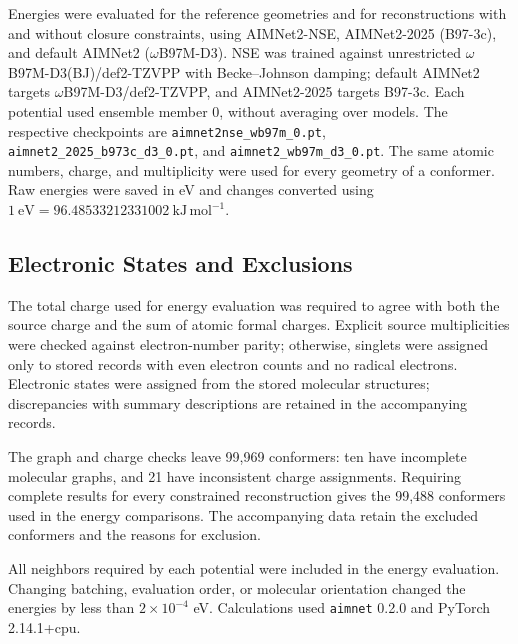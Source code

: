 \documentclass[%
 preprint,
superscriptaddress,
 amsmath,amssymb,
 aip,
 jcp,
]{revtex4-2}
\begin{document}
Energies were evaluated for the reference geometries and for reconstructions with and without closure constraints, using AIMNet2-NSE, AIMNet2-2025 (B97-3c), and default AIMNet2 ($\omega$B97M-D3).\cite{AIMNet2-NSE,AIMNet2,AIMNetCentralModelGuide}
NSE was trained against unrestricted $\omega$B97M-D3(BJ)/def2-TZVPP with Becke--Johnson damping; default AIMNet2 targets $\omega$B97M-D3/def2-TZVPP, and AIMNet2-2025 targets B97-3c.\cite{AIMNet2-NSE,AIMNet2,AIMNetCentralModelGuide}
Each potential used ensemble member 0, without averaging over models.
The respective checkpoints are \texttt{aimnet2nse\_}\allowbreak\texttt{wb97m\_0.pt}, \texttt{aimnet2\_2025\_}\allowbreak\texttt{b973c\_d3\_0.pt}, and \texttt{aimnet2\_}\allowbreak\texttt{wb97m\_d3\_0.pt}.
The same atomic numbers, charge, and multiplicity were used for every geometry of a conformer.
Raw energies were saved in eV and changes converted using $1\ \mathrm{eV}=96.48533212331002\ \mathrm{kJ\,mol^{-1}}$.

\subsection{Electronic States and Exclusions}

The total charge used for energy evaluation was required to agree with both the source charge and the sum of atomic formal charges.
Explicit source multiplicities were checked against electron-number parity; otherwise, singlets were assigned only to stored records with even electron counts and no radical electrons.
Electronic states were assigned from the stored molecular structures; discrepancies with summary descriptions are retained in the accompanying records.

The graph and charge checks leave 99,969 conformers: ten have incomplete molecular graphs, and 21 have inconsistent charge assignments.
Requiring complete results for every constrained reconstruction gives the 99,488 conformers used in the energy comparisons.
The accompanying data retain the excluded conformers and the reasons for exclusion.

All neighbors required by each potential were included in the energy evaluation.
Changing batching, evaluation order, or molecular orientation changed the energies by less than $2\times10^{-4}$ eV.
Calculations used \texttt{aimnet} 0.2.0 and PyTorch 2.14.1+cpu.
\end{document}
